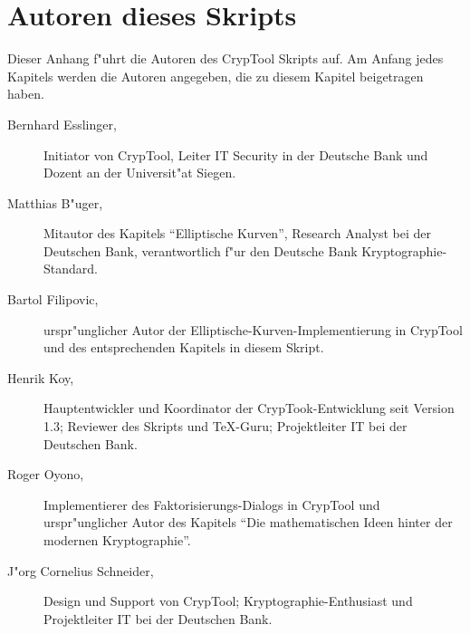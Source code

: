 \section{Autoren dieses Skripts}

Dieser Anhang f"uhrt die Autoren des CrypTool Skripts auf. Am Anfang jedes
Kapitels werden die Autoren angegeben, die zu diesem Kapitel beigetragen haben.

\begin{description}
\item[Bernhard Esslinger,] Initiator von CrypTool, Leiter IT Security in der Deutsche
Bank und Dozent an der Universit"at Siegen.
 
\item[Matthias B"uger,] Mitautor des Kapitels ``Elliptische Kurven'',
Research Analyst bei der Deutschen Bank, verantwortlich f"ur den Deutsche Bank
Kryptographie-Standard.

\item[Bartol Filipovic,] urspr"unglicher Autor der
Elliptische-Kurven-Implementierung in CrypTool und des entsprechenden Kapitels
in diesem Skript.

\item[Henrik Koy, ] Hauptentwickler und Koordinator der CrypTook-Entwicklung
seit Version 1.3; Reviewer des Skripts und \TeX{}-Guru; Projektleiter IT bei der
Deutschen Bank.

\item[Roger Oyono, ] Implementierer des Faktorisierungs-Dialogs in CrypTool und urspr"unglicher Autor des Kapitels "`Die mathematischen Ideen hinter der modernen Kryptographie"'.

\item[J"org Cornelius Schneider,] Design und Support von CrypTool;
Kryptographie-Enthusiast und Projektleiter IT bei der Deutschen Bank.

\end{description}

